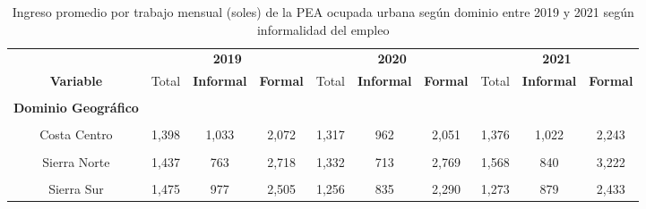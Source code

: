 \documentclass[
  letterpaper,
  12pt,
  oneside,
  spanish,
  doublespacing,
  headsepline,
  parskip]{MastersDoctoralThesis}
\begin{document}
\hypertarget{tbl-ing_dominio}{}
\begin{table}[H]
\caption{\label{tbl-ing_dominio}Ingreso promedio por trabajo mensual (soles) de la PEA ocupada urbana
según dominio entre 2019 y 2021 según informalidad del empleo }\tabularnewline

\centering\begingroup\fontsize{9}{11}\selectfont

\begin{tabular}{cccccccccc}
\toprule
\multicolumn{1}{c}{ } & \multicolumn{3}{c}{\textbf{2019}} & \multicolumn{3}{c}{\textbf{2020}} & \multicolumn{3}{c}{\textbf{2021}} \\
\cmidrule(l{3pt}r{3pt}){2-4} \cmidrule(l{3pt}r{3pt}){5-7} \cmidrule(l{3pt}r{3pt}){8-10}
\textbf{Variable} & Total & \textbf{Informal} & \textbf{Formal} & Total & \textbf{Informal} & \textbf{Formal} & Total & \textbf{Informal} & \textbf{Formal}\\
\midrule
\cellcolor{gray!6}{\textbf{Nacional}} & \cellcolor{gray!6}{1,595} & \cellcolor{gray!6}{1,037} & \cellcolor{gray!6}{2,599} & \cellcolor{gray!6}{1,407} & \cellcolor{gray!6}{901} & \cellcolor{gray!6}{2,380} & \cellcolor{gray!6}{1,443} & \cellcolor{gray!6}{989} & \cellcolor{gray!6}{2,473}\\
\textbf{Dominio Geográfico} &  &  &  &  &  &  &  &  & \\
\cellcolor{gray!6}{Costa Norte} & \cellcolor{gray!6}{1,302} & \cellcolor{gray!6}{941} & \cellcolor{gray!6}{2,198} & \cellcolor{gray!6}{1,167} & \cellcolor{gray!6}{811} & \cellcolor{gray!6}{2,035} & \cellcolor{gray!6}{1,303} & \cellcolor{gray!6}{947} & \cellcolor{gray!6}{2,273}\\
Costa Centro & 1,398 & 1,033 & 2,072 & 1,317 & 962 & 2,051 & 1,376 & 1,022 & 2,243\\
\cellcolor{gray!6}{Costa Sur} & \cellcolor{gray!6}{1,560} & \cellcolor{gray!6}{1,071} & \cellcolor{gray!6}{2,518} & \cellcolor{gray!6}{1,390} & \cellcolor{gray!6}{918} & \cellcolor{gray!6}{2,317} & \cellcolor{gray!6}{1,401} & \cellcolor{gray!6}{1,008} & \cellcolor{gray!6}{2,397}\\
\addlinespace
Sierra Norte & 1,437 & 763 & 2,718 & 1,332 & 713 & 2,769 & 1,568 & 840 & 3,222\\
\cellcolor{gray!6}{Sierra Centro} & \cellcolor{gray!6}{1,339} & \cellcolor{gray!6}{845} & \cellcolor{gray!6}{2,454} & \cellcolor{gray!6}{1,276} & \cellcolor{gray!6}{706} & \cellcolor{gray!6}{2,694} & \cellcolor{gray!6}{1,209} & \cellcolor{gray!6}{804} & \cellcolor{gray!6}{2,588}\\
Sierra Sur & 1,475 & 977 & 2,505 & 1,256 & 835 & 2,290 & 1,273 & 879 & 2,433\\

\end{tabular}
\end{table}
\end{document}

